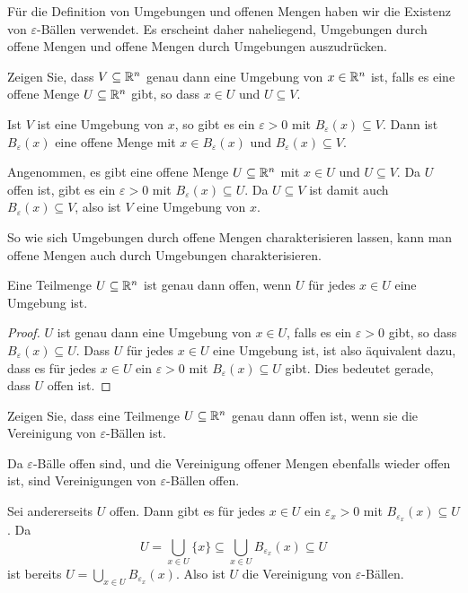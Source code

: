 \documentclass[a4paper,10pt]{article}
\begin{document}
Für die Definition von Umgebungen und offenen Mengen haben wir die Existenz von $\varepsilon$-Bällen verwendet. Es erscheint daher naheliegend, Umgebungen durch offene Mengen und offene Mengen durch Umgebungen auszudrücken.


\begin{question}
 Zeigen Sie, dass $V \subseteq \mathbb{R}^n$ genau dann eine Umgebung von $x \in \mathbb{R}^n$ ist, falls es eine offene Menge $U \subseteq \mathbb{R}^n$ gibt, so dass $x \in U$ und $U \subseteq V$.
\end{question}
\begin{solution}
 Ist $V$ ist eine Umgebung von $x$, so gibt es ein $\varepsilon > 0$ mit $B_\varepsilon(x) \subseteq V$. Dann ist $B_\varepsilon(x)$ eine offene Menge mit $x \in B_\varepsilon(x)$ und $B_\varepsilon(x) \subseteq V$.
 
 Angenommen, es gibt eine offene Menge $U \subseteq \mathbb{R}^n$ mit $x \in U$ und $U \subseteq V$. Da $U$ offen ist, gibt es ein $\varepsilon > 0$ mit $B_\varepsilon(x) \subseteq U$. Da $U \subseteq V$ ist damit auch $B_\varepsilon(x) \subseteq V$, also ist $V$ eine Umgebung von $x$.
\end{solution}


So wie sich Umgebungen durch offene Mengen charakterisieren lassen, kann man offene Mengen auch durch Umgebungen charakterisieren.


\begin{lem}
 Eine Teilmenge $U \subseteq \mathbb{R}^n$ ist genau dann offen, wenn $U$ für jedes $x \in U$ eine Umgebung ist.
\end{lem}
\begin{proof}
 $U$ ist genau dann eine Umgebung von $x \in U$, falls es ein $\varepsilon > 0$ gibt, so dass $B_\varepsilon(x) \subseteq U$. Dass $U$ für jedes $x \in U$ eine Umgebung ist, ist also äquivalent dazu, dass es für jedes $x \in U$ ein $\varepsilon > 0$ mit $B_\varepsilon(x) \subseteq U$ gibt. Dies bedeutet gerade, dass $U$ offen ist.
\end{proof}


\begin{question}
 Zeigen Sie, dass eine Teilmenge $U \subseteq \mathbb{R}^n$ genau dann offen ist, wenn sie die Vereinigung von $\varepsilon$-Bällen ist.
\end{question}
\begin{solution}
 Da $\varepsilon$-Bälle offen sind, und die Vereinigung offener Mengen ebenfalls wieder offen ist, sind Vereinigungen von $\varepsilon$-Bällen offen.
 
 Sei andererseits $U$ offen. Dann gibt es für jedes $x \in U$ ein $\varepsilon_x > 0$ mit $B_{\varepsilon_x}(x) \subseteq U$. Da
 \[
  U
  = \bigcup_{x \in U} \{x\}
  \subseteq \bigcup_{x \in U} B_{\varepsilon_x}(x)
  \subseteq U
 \]
 ist bereits $U = \bigcup_{x \in U} B_{\varepsilon_x}(x)$. Also ist $U$ die Vereinigung von $\varepsilon$-Bällen.
\end{solution}
\end{document}
